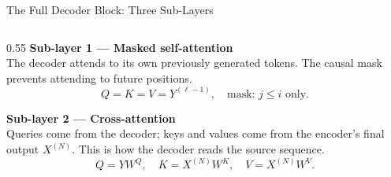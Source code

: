 \documentclass[aspectratio=169]{beamer}
\begin{document}
\begin{frame}{The Full Decoder Block: Three Sub-Layers}
\begin{columns}[T]
\begin{column}{0.55\textwidth}
\medskip
\textbf{\textsf{Sub-layer 1 — Masked self-attention}}\\
The decoder attends to its own previously generated
tokens. The causal mask prevents attending to
future positions.
\[
  Q = K = V = Y^{(\ell-1)},\quad
  \text{mask: } j \le i \text{ only.}
\]

\medskip
\textbf{\textsf{Sub-layer 2 — Cross-attention}}\\
Queries come from the decoder; keys and values come
from the encoder's final output $X^{(N)}$.
This is how the decoder reads the source sequence.
\[
  Q = Y W^Q,\quad K = X^{(N)}W^K,\quad V = X^{(N)}W^V.
\]

\end{column}
\end{columns}

\end{frame}
%
%
\end{document}
